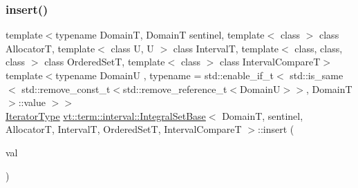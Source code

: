 \mbox{\label{structvt_1_1term_1_1interval_1_1_integral_set_base_a7476d33df36a287580cdecc9dd6c2bd1}} 
\subsubsection{\texorpdfstring{insert()}{insert()}\hspace{0.1cm}{\footnotesize\ttfamily [1/2]}}
{\footnotesize\ttfamily template$<$typename DomainT, DomainT sentinel, template$<$ class $>$ class AllocatorT, template$<$ class U, U $>$ class IntervalT, template$<$ class, class, class $>$ class Ordered\+SetT, template$<$ class $>$ class Interval\+CompareT$>$ \\
template$<$typename DomainU , typename  = std\+::enable\+\_\+if\+\_\+t$<$      std\+::is\+\_\+same$<$        std\+::remove\+\_\+const\+\_\+t$<$std\+::remove\+\_\+reference\+\_\+t$<$\+Domain\+U$>$$>$, Domain\+T      $>$\+::value    $>$$>$ \\
\hyperlink{structvt_1_1term_1_1interval_1_1_integral_set_base_a111b2ec1ea960a40ba4270be702f11f1}{Iterator\+Type} \hyperlink{structvt_1_1term_1_1interval_1_1_integral_set_base}{vt\+::term\+::interval\+::\+Integral\+Set\+Base}$<$ DomainT, sentinel, AllocatorT, IntervalT, Ordered\+SetT, Interval\+CompareT $>$\+::insert (\begin{DoxyParamCaption}\item[{DomainU \&\&}]{val }\end{DoxyParamCaption})\hspace{0.3cm}{\ttfamily [inline]}}

\mbox{\label{structvt_1_1term_1_1interval_1_1_integral_set_base_a34422ad0f4a5341e700a9264f921381d}} 
